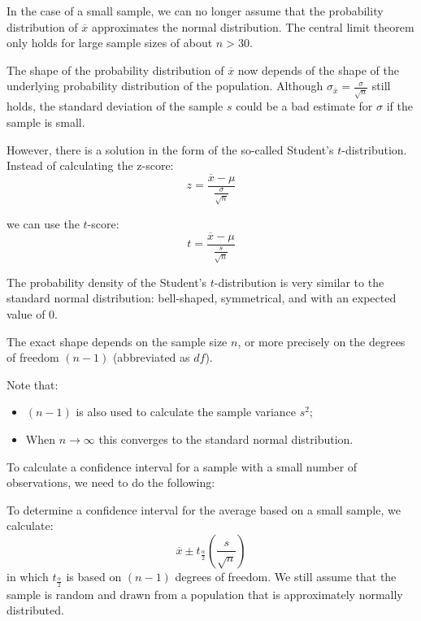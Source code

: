 In the case of a small sample, we can no longer assume that the probability distribution of $\overline{x}$ approximates the normal distribution. 
The central limit theorem only holds for large sample sizes of about $n > 30$.

The shape of the probability distribution of $\overline{x}$ now depends of the shape of the underlying probability distribution of the population. 
Although $\sigma_{\overline{x}} = \frac{\sigma}{\sqrt{n}}$ still holds, the standard deviation of the sample $s$ 
could be a bad estimate for $\sigma$ if the sample is small.

However, there is a solution in the form of the so-called Student's $t$-distribution. Instead of calculating the z-score:
\[ z = \frac{\overline{x} - \mu}{\frac{\sigma}{\sqrt{n}}} \]

we can use the $t$-score:
\[ t = \frac{\overline{x} - \mu}{\frac{s}{\sqrt{n}}} \]

The probability density of the Student's $t$-distribution is very similar to the standard normal distribution: 
bell-shaped, symmetrical, and with an expected value of 0.

The exact shape depends on the sample size $n$, or more precisely on the degrees of freedom $(n-1)$ (abbreviated as $df$).

Note that:
\begin{itemize}
  \item $(n-1)$ is also used to calculate the sample variance $s^{2}$;
  \item When $n \rightarrow \infty$ this converges to the standard normal distribution.
\end{itemize}

To calculate a confidence interval for a sample with a small number of observations, we need to do the following:

\begin{definition}
  To determine a confidence interval for the average based on a small sample, we calculate:
  \[ \overline{x} \pm t_{\frac{\alpha}{2}}(\frac{s}{\sqrt{n}}) \]
  in which $t_{\frac{\alpha}{2}}$ is based on $(n-1)$ degrees of freedom. 
  We still assume that the sample is random and drawn from a population that is approximately normally distributed.
\end{definition}

